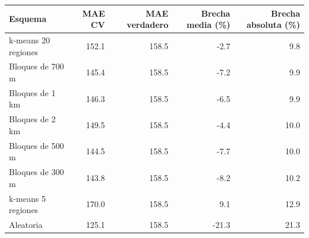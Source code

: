 
\begin{tabular}{lrrrr}
\toprule
Esquema & MAE CV & MAE verdadero & Brecha media (\%) & Brecha absoluta (\%)\\
\midrule
k-means 20 regiones & 152.1 & 158.5 & -2.7 & 9.8\\
Bloques de 700 m & 145.4 & 158.5 & -7.2 & 9.9\\
Bloques de 1 km & 146.3 & 158.5 & -6.5 & 9.9\\
Bloques de 2 km & 149.5 & 158.5 & -4.4 & 10.0\\
Bloques de 500 m & 144.5 & 158.5 & -7.7 & 10.0\\
Bloques de 300 m & 143.8 & 158.5 & -8.2 & 10.2\\
k-means 5 regiones & 170.0 & 158.5 & 9.1 & 12.9\\
Aleatoria & 125.1 & 158.5 & -21.3 & 21.3\\
\bottomrule
\end{tabular}
